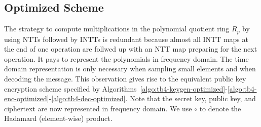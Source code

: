 \begin{algorithm}[!t] \label{algo:tb4-dec-naive}
\begin{scriptsize}
\caption{\emph{$\mathsf{Dec}$}}
\end{scriptsize}
\end{algorithm} 

\subsection{Optimized Scheme}

The strategy to compute multiplications in the polynomial quotient ring $R_p$ by using NTTs followed by INTTs is redundant because almost all INTT maps at the end of one operation are follwed up with an NTT map preparing for the next operation. It pays to represent the polynomials in frequency domain. The time domain representation is only necessary when sampling small elements and when decoding the message. This observation gives rise to the equivalent public key encryption scheme specified by Algorithms~\ref{algo:tb4-keygen-optimized}-\ref{algo:tb4-enc-optimized}-\ref{algo:tb4-dec-optimized}. Note that the secret key, public key, and ciphertext are now represented in frequency domain. We use $\circ$ to denote the Hadamard (element-wise) product.

